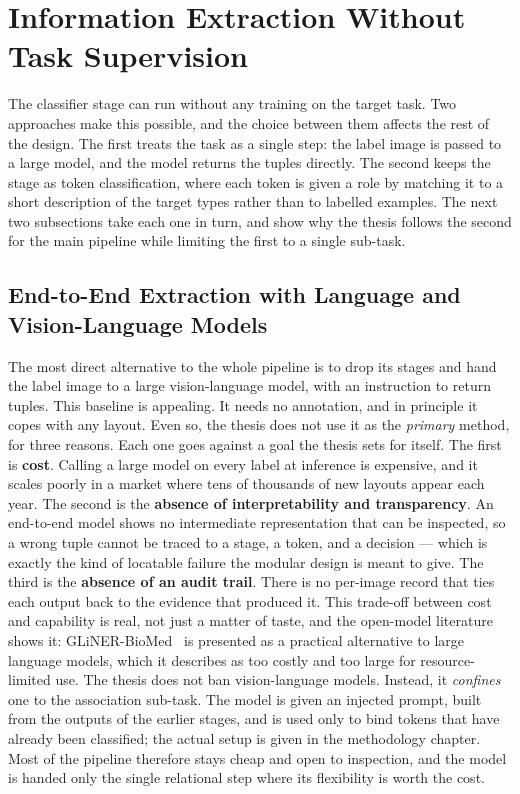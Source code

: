 \section{Information Extraction Without Task Supervision}\label{sec:rw-ie-paradigms}
The classifier stage can run without any training on the target task. Two approaches make this possible, and the choice between them affects the rest of the design. The first treats the task as a single step: the label image is passed to a large model, and the model returns the tuples directly. The second keeps the stage as token classification, where each token is given a role by matching it to a short description of the target types rather than to labelled examples. The next two subsections take each one in turn, and show why the thesis follows the second for the main pipeline while limiting the first to a single sub-task.
\subsection{End-to-End Extraction with Language and Vision-Language Models}\label{sec:rw-llm}

The most direct alternative to the whole pipeline is to drop its stages and hand the label image to a large vision-language model, with an instruction to return tuples. This baseline is appealing. It needs no annotation, and in principle it copes with any layout. Even so, the thesis does not use it as the \emph{primary} method, for three reasons. Each one goes against a goal the thesis sets for itself. The first is \textbf{cost}. Calling a large model on every label at inference is expensive, and it scales poorly in a market where tens of thousands of new layouts appear each year. The second is the \textbf{absence of interpretability and transparency}. An end-to-end model shows no intermediate representation that can be inspected, so a wrong tuple cannot be traced to a stage, a token, and a decision --- which is exactly the kind of locatable failure the modular design is meant to give. The third is the \textbf{absence of an audit trail}. There is no per-image record that ties each output back to the evidence that produced it. This trade-off between cost and capability is real, not just a matter of taste, and the open-model literature shows it: GLiNER-BioMed~\cite{yazdani2025glinerbiomed} is presented as a practical alternative to large language models, which it describes as too costly and too large for resource-limited use. The thesis does not ban vision-language models. Instead, it \emph{confines} one to the association sub-task. The model is given an injected prompt, built from the outputs of the earlier stages, and is used only to bind tokens that have already been classified; the actual setup is given in the methodology chapter. Most of the pipeline therefore stays cheap and open to inspection, and the model is handed only the single relational step where its flexibility is worth the cost.

